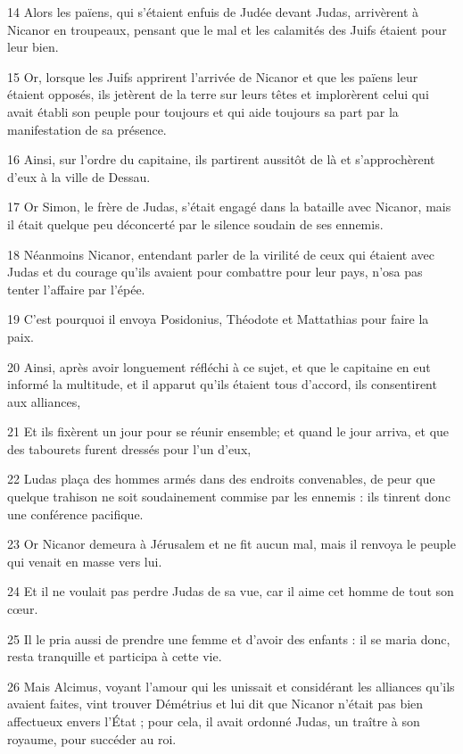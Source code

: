\par 14 Alors les païens, qui s'étaient enfuis de Judée devant Judas, arrivèrent à Nicanor en troupeaux, pensant que le mal et les calamités des Juifs étaient pour leur bien.
\par 15 Or, lorsque les Juifs apprirent l'arrivée de Nicanor et que les païens leur étaient opposés, ils jetèrent de la terre sur leurs têtes et implorèrent celui qui avait établi son peuple pour toujours et qui aide toujours sa part par la manifestation de sa présence.
\par 16 Ainsi, sur l'ordre du capitaine, ils partirent aussitôt de là et s'approchèrent d'eux à la ville de Dessau.
\par 17 Or Simon, le frère de Judas, s'était engagé dans la bataille avec Nicanor, mais il était quelque peu déconcerté par le silence soudain de ses ennemis.
\par 18 Néanmoins Nicanor, entendant parler de la virilité de ceux qui étaient avec Judas et du courage qu'ils avaient pour combattre pour leur pays, n'osa pas tenter l'affaire par l'épée.
\par 19 C'est pourquoi il envoya Posidonius, Théodote et Mattathias pour faire la paix.
\par 20 Ainsi, après avoir longuement réfléchi à ce sujet, et que le capitaine en eut informé la multitude, et il apparut qu'ils étaient tous d'accord, ils consentirent aux alliances,
\par 21 Et ils fixèrent un jour pour se réunir ensemble; et quand le jour arriva, et que des tabourets furent dressés pour l'un d'eux,
\par 22 Ludas plaça des hommes armés dans des endroits convenables, de peur que quelque trahison ne soit soudainement commise par les ennemis : ils tinrent donc une conférence pacifique.
\par 23 Or Nicanor demeura à Jérusalem et ne fit aucun mal, mais il renvoya le peuple qui venait en masse vers lui.
\par 24 Et il ne voulait pas perdre Judas de sa vue, car il aime cet homme de tout son cœur.
\par 25 Il le pria aussi de prendre une femme et d'avoir des enfants : il se maria donc, resta tranquille et participa à cette vie.
\par 26 Mais Alcimus, voyant l'amour qui les unissait et considérant les alliances qu'ils avaient faites, vint trouver Démétrius et lui dit que Nicanor n'était pas bien affectueux envers l'État ; pour cela, il avait ordonné Judas, un traître à son royaume, pour succéder au roi.
